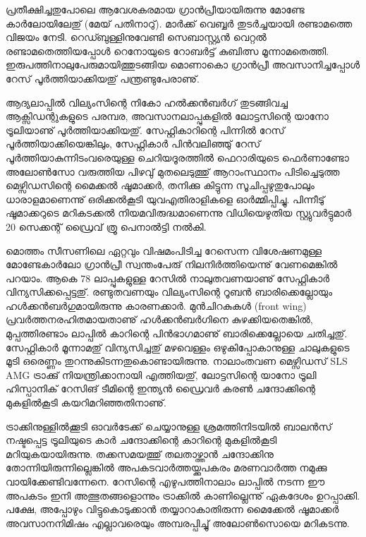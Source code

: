﻿
\vskip 2pt

പ്രതീക്ഷിച്ചതുപോലെ ആവേശകരമായ ഗ്രാന്‍പ്രീയായിരുന്നു മോണ്ടേ കാര്‍ലോയിലേതു് (മേയ് പതിനാറു്). മാര്‍ക്ക് 
വെബ്ബര്‍ തുടര്‍ച്ചയായി രണ്ടാമത്തെ വിജയം നേടി. റെഡ്ബുള്ളിനുവേണ്ടി സെബാസ്റ്റ്യന്‍ വെറ്റല്‍ രണ്ടാമതെത്തിയപ്പോള്‍ 
റെനോയുടെ റോബര്‍ട്ട് കുബിത്സ മൂന്നാമതെത്തി. ഇരുപത്തിനാലുപേരുമായിത്തുടങ്ങിയ മൊണാകൊ ഗ്രാന്‍പ്രീ 
അവസാനിച്ചപ്പോള്‍ റേസ് പൂര്‍ത്തിയാക്കിയതു് പന്ത്രണ്ടുപേരാണു്.

ആദ്യലാപ്പില്‍ വില്യംസിന്റെ നികോ ഹല്‍ക്കന്‍ബര്‍ഗ് തുടങ്ങിവച്ച ആക്സിഡന്റുകളുടെ പരമ്പര, അവസാനലാപ്പുകളില്‍ 
ലോട്ടസിന്റെ യാനോ ട്രൂലിയാണു് പൂര്‍ത്തിയാക്കിയതു്. സേഫ്റ്റികാറിന്റെ പിന്നില്‍ റേസ് പൂര്‍ത്തിയാക്കിയെങ്കിലും, 
സേഫ്റ്റികാര്‍ പിന്‍വലിഞ്ഞു് റേസ് പൂര്‍ത്തിയാകുന്നിടംവരെയുള്ള ചെറിയദൂരത്തില്‍ ഫെറാരിയുടെ ഫെര്‍ണാണ്ടോ 
അലോണ്‍സോ വരുത്തിയ പിഴവു് മുതലെടുത്തു് ആറാംസ്ഥാനം പിടിച്ചെടുത്ത മെഴ്സിഡസിന്റെ മൈക്കല്‍ ഷൂമാക്കര്‍,
തനിക്കു കിട്ടുന്ന സൂചിപ്പഴുതുപോലും ധാരാളമാണെന്നു് ഒരിക്കല്‍കൂടി യുവഎതിരാളികളെ ഓര്‍മ്മിപ്പിച്ചു. പിന്നീടു് ഷൂമാക്കറുടെ 
മറികടക്കല്‍ നിയമവിരുദ്ധമാണെന്നു വിധിയെഴുതിയ സ്റ്റ്യുവര്‍ട്ടുമാര്‍ 20 സെക്കന്റ് ഡ്രൈവ് ത്രൂ പെനാല്‍ട്ടി നല്‍കി.

മൊത്തം സീസണിലെ ഏറ്റവും വിഷമംപിടിച്ച റേസെന്ന വിശേഷണമുള്ള മോണ്ടേകാര്‍ലോ ഗ്രാന്‍പ്രീ സ്വന്തംപേരു് 
നിലനിര്‍ത്തിയെന്നു് വേണമെങ്കില്‍ പറയാം. ആകെ 78 ലാപ്പുകളുള്ള റേസില്‍ നാലുതവണയാണു് സേഫ്റ്റികാര്‍ 
വിന്യസിക്കപ്പെട്ടതു്. രണ്ടുതവണയും വില്യംസിന്റെ റൂബന്‍ ബാരിക്കെല്ലോയും ഹള്‍ക്കന്‍ബര്‍ഗുമായിരുന്നു കാരണക്കാര്‍. 
മുന്‍ചിറകുകള്‍ (front wing) പ്രവര്‍ത്തനരഹിതമായതാണു് ഹള്‍ക്കന്‍ബര്‍ഗിനെ കുഴക്കിയതെങ്കില്‍, മുപ്പത്തിരണ്ടാം 
ലാപ്പില്‍ കാറിന്റെ പിന്‍ഭാഗമാണു് ബാരിക്കെല്ലോയെ ചതിച്ചതു്. സേഫ്റ്റികാര്‍ മൂന്നാമതു് വിന്യസിച്ചതു് മഴവെള്ളം 
ഒഴുകിപ്പോകാനുള്ള ചാലുകളുടെ മൂടി ഒരെണ്ണം തുറന്നുകിടന്നതുകൊണ്ടായിരുന്നു. നാലാംതവണ മെഴ്സിഡസ് 
SLS AMG ട്രാക്കു് നിയന്ത്രിക്കാനായി എത്തിയതു്, ലോട്ടസിന്റെ യാനോ ട്രൂലി ഹിസ്പാനിക് റേസിങ് ടീമിന്റെ ഇന്ത്യന്‍ 
ഡ്രൈവര്‍ കരണ്‍ ചന്ദോക്കിന്റെ മുകളില്‍കൂടി കയറിമറിഞ്ഞതിനാണു്.

ട്രാക്കിനുള്ളില്‍ക്കൂടി ഓവര്‍ടേക്ക് ചെയ്യാനുള്ള ശ്രമത്തിനിടയില്‍ ബാലന്‍സ് നഷ്ടപ്പെട്ട ട്രൂലിയുടെ കാര്‍ ചന്ദോക്കിന്റെ 
കാറിന്റെ മുകളില്‍കൂടി മറിയുകയായിരുന്നു. തക്കസമയത്തു് തലതാഴ്ത്താന്‍ ചന്ദോക്കിനു തോന്നിയിരുന്നില്ലെങ്കില്‍ 
അപകടവാര്‍ത്തയ്ക്കുപകരം മരണവാര്‍ത്ത നമുക്കു വായിക്കേണ്ടിവന്നേനെ. റേസിന്റെ എഴുപത്തിനാലാം 
ലാപ്പില്‍ നടന്ന ഈ അപകടം ഇനി അത്ഭുതങ്ങളൊന്നും ട്രാക്കില്‍ കാണില്ലെന്നു് ഏകദേശം ഉറപ്പാക്കി. പക്ഷേ, അപ്പോഴും 
വിട്ടുകൊടുക്കാന്‍ തയ്യാറാകാതിരുന്ന മൈക്കേല്‍ ഷൂമാക്കര്‍ അവസാനനിമിഷം എല്ലാവരെയും അമ്പരപ്പിച്ചു് 
അലോണ്‍സൊയെ മറികടന്നു.

